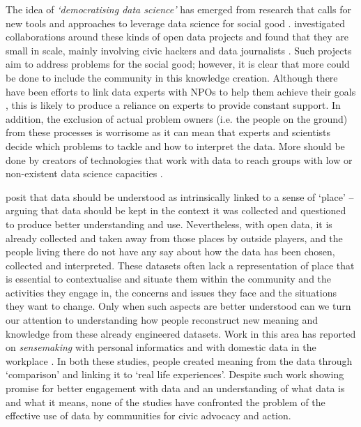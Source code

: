 The idea of \textit{`democratising data science'} has emerged from research that calls for new tools and approaches to leverage data science for social good \citep{chou_democratizing_2014,choi_characteristics_2017}. \citet{choi_characteristics_2017} investigated collaborations around these kinds of open data projects and found that they are small in scale, mainly involving civic hackers and data journalists \citep{parasie_data-driven_2013}. Such projects aim to address problems for the social good; however, it is clear that more could be done to include the community in this knowledge creation. Although there have been efforts to link data experts with NPOs to help them achieve their goals \citep{erete_storytelling_2016}, this is likely to produce a reliance on experts to provide constant support. In addition, the exclusion of actual problem owners (i.e. the people on the ground) from these processes is worrisome as it can mean that experts and scientists decide which problems to tackle and how to interpret the data. More should be done by creators of technologies that work with data to reach groups with low or non-existent data science capacities \citep{chou_democratizing_2014}.

\citet{taylor_data--place:_2015} posit that data should be understood as intrinsically linked to a sense of `place' -- arguing that data should be kept in the context it was collected and questioned to produce better understanding and use. Nevertheless, with open data, it is already collected and taken away from those places by outside players, and the people living there do not have any say about how the data has been chosen, collected and interpreted. These datasets often lack a representation of place that is essential to contextualise and situate them within the community and the activities they engage in, the concerns and issues they face and the situations they want to change. Only when such aspects are better understood can we turn our attention to understanding how people reconstruct new meaning and knowledge from these already engineered datasets. Work in this area has reported on \textit{sensemaking} \citep{furnas_making_2005} with personal informatics \citep{puussaar_enhancing_2017} and with domestic data in the workplace \citep{clear_id_2017}. In both these studies, people created meaning from the data through `comparison' and linking it to `real life experiences'. Despite such work showing promise for better engagement with data and an understanding of what data is and what it means, none of the studies have confronted the problem of the effective use of data by communities for civic advocacy and action.

